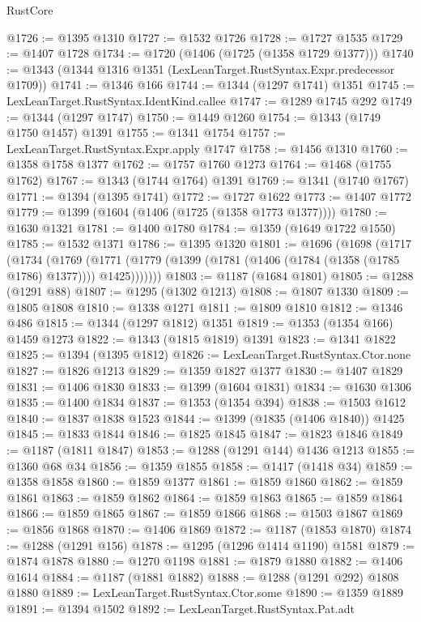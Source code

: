 \begin{lexlean}{RustCore}
\begin{coremodule}
@1726 := @1395 @1310
@1727 := @1532 @1726
@1728 := @1727 @1535
@1729 := @1407 @1728
@1734 := @1720 (@1406 (@1725 (@1358 @1729 @1377)))
@1740 := @1343 (@1344 @1316 @1351 (LexLeanTarget.RustSyntax.Expr.predecessor @1709))
@1741 := @1346 @166
@1744 := @1344 (@1297 @1741) @1351
@1745 := LexLeanTarget.RustSyntax.IdentKind.callee
@1747 := @1289 @1745 @292
@1749 := @1344 (@1297 @1747)
@1750 := @1449 @1260
@1754 := @1343 (@1749 @1750 @1457) @1391
@1755 := @1341 @1754
@1757 := LexLeanTarget.RustSyntax.Expr.apply @1747
@1758 := @1456 @1310
@1760 := @1358 @1758 @1377
@1762 := @1757 @1760 @1273
@1764 := @1468 (@1755 @1762)
@1767 := @1343 (@1744 @1764) @1391
@1769 := @1341 (@1740 @1767)
@1771 := @1394 (@1395 @1741)
@1772 := @1727 @1622
@1773 := @1407 @1772
@1779 := @1399 (@1604 (@1406 (@1725 (@1358 @1773 @1377))))
@1780 := @1630 @1321
@1781 := @1400 @1780
@1784 := @1359 (@1649 @1722 @1550)
@1785 := @1532 @1371
@1786 := @1395 @1320
@1801 := @1696
    (@1698
      (@1717
        (@1734
          (@1769
            (@1771 (@1779 (@1399 (@1781 (@1406 (@1784 (@1358 (@1785 @1786) @1377)))) @1425)))))))
@1803 := @1187 (@1684 @1801)
@1805 := @1288 (@1291 @88)
@1807 := @1295 (@1302 @1213)
@1808 := @1807 @1330
@1809 := @1805 @1808
@1810 := @1338 @1271
@1811 := @1809 @1810
@1812 := @1346 @486
@1815 := @1344 (@1297 @1812) @1351
@1819 := @1353 (@1354 @166) @1459 @1273
@1822 := @1343 (@1815 @1819) @1391
@1823 := @1341 @1822
@1825 := @1394 (@1395 @1812)
@1826 := LexLeanTarget.RustSyntax.Ctor.none
@1827 := @1826 @1213
@1829 := @1359 @1827 @1377
@1830 := @1407 @1829
@1831 := @1406 @1830
@1833 := @1399 (@1604 @1831)
@1834 := @1630 @1306
@1835 := @1400 @1834
@1837 := @1353 (@1354 @394)
@1838 := @1503 @1612
@1840 := @1837 @1838 @1523
@1844 := @1399 (@1835 (@1406 @1840)) @1425
@1845 := @1833 @1844
@1846 := @1825 @1845
@1847 := @1823 @1846
@1849 := @1187 (@1811 @1847)
@1853 := @1288 (@1291 @144) @1436 @1213
@1855 := @1360 @68 @34
@1856 := @1359 @1855
@1858 := @1417 (@1418 @34)
@1859 := @1358 @1858
@1860 := @1859 @1377
@1861 := @1859 @1860
@1862 := @1859 @1861
@1863 := @1859 @1862
@1864 := @1859 @1863
@1865 := @1859 @1864
@1866 := @1859 @1865
@1867 := @1859 @1866
@1868 := @1503 @1867
@1869 := @1856 @1868
@1870 := @1406 @1869
@1872 := @1187 (@1853 @1870)
@1874 := @1288 (@1291 @156)
@1878 := @1295 (@1296 @1414 @1190) @1581
@1879 := @1874 @1878
@1880 := @1270 @1198
@1881 := @1879 @1880
@1882 := @1406 @1614
@1884 := @1187 (@1881 @1882)
@1888 := @1288 (@1291 @292) @1808 @1880
@1889 := LexLeanTarget.RustSyntax.Ctor.some
@1890 := @1359 @1889
@1891 := @1394 @1502
@1892 := LexLeanTarget.RustSyntax.Pat.adt

\end{coremodule}
\end{lexlean}
